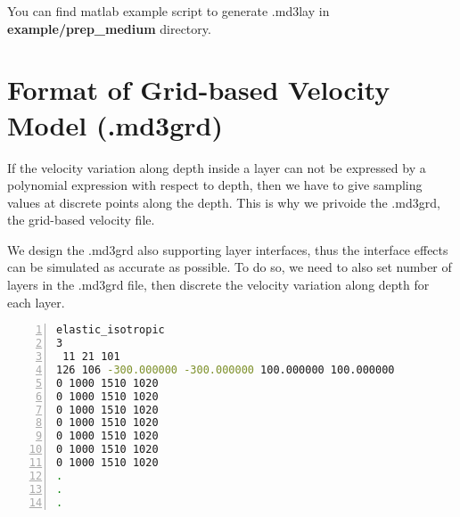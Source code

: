 You can find matlab example script to generate .md3lay in \textbf{example/prep\_medium} directory.

\section{Format of Grid-based Velocity Model (.md3grd)} \label{md3grd}

If the velocity variation along depth inside a layer can not be expressed by a polynomial expression
with respect to depth, then we have to give sampling values at discrete points along the depth.
This is why we privoide the .md3grd, the grid-based velocity file.

We design the .md3grd also supporting layer interfaces,
thus the interface effects can be simulated as accurate as possible.
To do so, we need to also set number of layers in the .md3grd file,
then discrete the velocity variation along depth for each layer.


\begin{lstlisting}[language=bash, caption=Example of .mdgrd file,
   numbers=left, numbersep=5pt,numberstyle=\tiny\color{codegray}, commentstyle=\color{codegreen},
    label={lst_medium_md3grd},
   frame=tb]
elastic_isotropic
3
 11 21 101
126 106 -300.000000 -300.000000 100.000000 100.000000
0 1000 1510 1020
0 1000 1510 1020
0 1000 1510 1020
0 1000 1510 1020
0 1000 1510 1020
0 1000 1510 1020
0 1000 1510 1020
.
.
.
\end{lstlisting}



